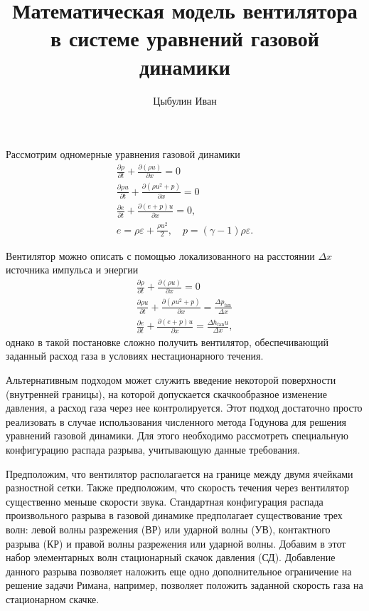 \documentclass[12pt]{article}
\author{Цыбулин Иван}
\title{Математическая модель вентилятора в системе уравнений газовой динамики}
\newcommand{\pd}[2]{\frac{\partial #1}{\partial #2}}
\begin{document}
\maketitle
Рассмотрим одномерные уравнения газовой динамики
\begin{gather*}
\pd{\rho}{t} + \pd{(\rho u)}{x} = 0\\
\pd{\rho u}{t} + \pd{(\rho u^2 + p)}{x} = 0\\
\pd{e}{t} + \pd{(e + p)u}{x} = 0,\\
e = \rho \varepsilon + \frac{\rho u^2}{2}, \quad p = (\gamma - 1) \rho \varepsilon.
\end{gather*}

Вентилятор можно описать с помощью локализованного на расстоянии $\Delta x$ источника импульса и энергии
\begin{gather*}
\pd{\rho}{t} + \pd{(\rho u)}{x} = 0\\
\pd{\rho u}{t} + \pd{(\rho u^2 + p)}{x} = \frac{\Delta p_\text{fan}}{\Delta x}\\
\pd{e}{t} + \pd{(e + p)u}{x} = \frac{\Delta h_\text{fan} u}{\Delta x},
\end{gather*}
однако в такой постановке сложно получить вентилятор, обеспечивающий заданный расход газа в условиях нестационарного течения.

Альтернативным подходом может служить введение некоторой поверхности (внутренней границы), на которой допускается скачкообразное изменение давления, а расход газа через нее контролируется. Этот подход достаточно просто реализовать в случае использования численного метода Годунова для решения уравнений газовой динамики. Для этого необходимо рассмотреть специальную конфигурацию распада разрыва, учитывающую данные требования.

Предположим, что вентилятор располагается на границе между двумя ячейками разностной сетки. Также предположим, что скорость течения через вентилятор существенно меньше скорости звука. Стандартная конфигурация распада произвольного разрыва в газовой динамике предполагает существование трех волн:
левой волны разрежения (ВР) или ударной волны (УВ), контактного разрыва (КР) и правой волны разрежения или ударной волны. Добавим в этот набор элементарных волн стационарный скачок давления (СД). Добавление данного разрыва позволяет наложить еще одно дополнительное ограничение на решение задачи Римана, например, позволяет положить заданной скорость газа на стационарном скачке.
\end{document}

